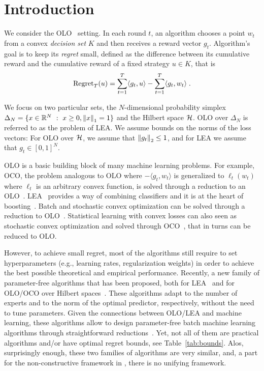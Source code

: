 \section{Introduction}
\label{section:introduction}

We consider the \ac{OLO}~\cite{Cesa-BianchiL06,Shalev-Shwartz12} setting. In each round $t$, an algorithm chooses a point
$w_t$ from a convex \emph{decision set} $K$ and then receives a reward vector
$g_t$. Algorithm's goal is to keep its \emph{regret} small, defined as the
difference between its cumulative reward and the cumulative reward of a fixed
strategy $u \in K$, that is
\[
\operatorname{Regret}_T(u) = \sum_{t=1}^T \langle g_t, u \rangle - \sum_{t=1}^T \langle g_t, w_t \rangle \; .
\]

We focus on two particular sets, the $N$-dimensional probability simplex
$\Delta_N = \{ x \in \mathbb{R}^N ~:~ x \ge 0, \left\|{x}\right\|_1 = 1\}$ and the Hilbert space
$\mathcal{H}$.  \ac{OLO} over $\Delta_N$ is referred to as the problem of \ac{LEA}.  We
assume bounds on the norms of the loss vectors: For \ac{OLO} over $\mathcal{H}$, we
assume that $\left\|{g_t}\right\|_2 \le 1$, and for \ac{LEA} we assume that
$g_t \in [0,1]^N$.

\ac{OLO} is a basic building block of many machine learning problems. For
example, \ac{OCO}, the problem analogous to \ac{OLO} where $-\langle g_t, w_t \rangle$ is
generalized to $\ell_t(w_t)$ where $\ell_t$ is an arbitrary convex function, is
solved through a reduction to an \ac{OLO}~\cite{Shalev-Shwartz12}.
\ac{LEA}~\cite{LittlestoneW94, Vovk98,Cesa-BianchiFHHSW97} provides a way of
combining classifiers and it is at the heart of
boosting~\cite{FreundS97}. Batch and stochastic convex optimization
can be solved through a reduction to \ac{OLO}~\cite{Shalev-Shwartz12}.
Statistical learning with convex losses can also seen as stochastic convex
optimization and solved through \ac{OCO}~\cite{Munro51}, that in turns can be reduced to \ac{OLO}.

However, to achieve small regret, most of the algorithms still require to set
hyperparameters (e.g., learning rates, regularization weights) in
order to achieve the best possible theoretical and empirical performance.
Recently, a new family of parameter-free algorithms that has been proposed, both for \ac{LEA}~\cite{ChaudhuriFH09,ChernovV10,LuoS14,LuoS15,KoolenE15}
and for \ac{OLO}/\ac{OCO} over Hilbert spaces~\cite{StreeterM12,Orabona13, McMahanA13,McMahanO14,Orabona14}.
These algorithms adapt to the number of experts and to the norm of the optimal
predictor, respectively, without the need to tune parameters. 
Given the connections between \ac{OLO}/\ac{LEA} and machine learning, these algorithms
allow to design parameter-free batch machine learning algorithms through
straightforward reductions~\cite{Orabona14,LuoS15}.
Yet, not all of them are practical algorithms and/or have optimal regret bounds, see Table~\ref{tab:bounds}.
Alos, surprisingly enough, these two families of algorithms are very similar, and, a part for the non-constructive framework in \cite{FosterRS15}, there is no unifying framework.

